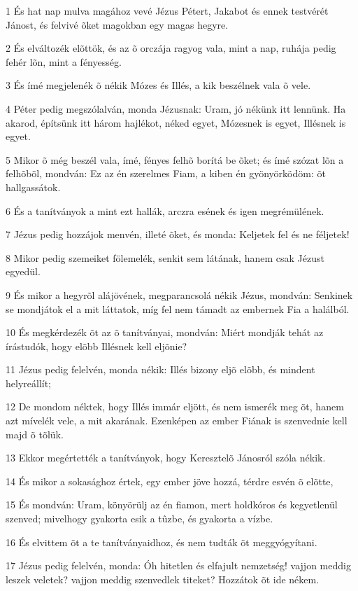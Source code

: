 \par 1 És hat nap mulva magához vevé Jézus Pétert, Jakabot és ennek testvérét Jánost, és felvivé õket magokban egy magas hegyre.
\par 2 És elváltozék elõttök, és az õ orczája ragyog vala, mint a nap, ruhája pedig fehér lõn, mint a fényesség.
\par 3 És ímé megjelenék õ nékik Mózes és Illés, a kik beszélnek vala õ vele.
\par 4 Péter pedig megszólalván, monda Jézusnak: Uram, jó nékünk itt lennünk. Ha akarod, építsünk itt három hajlékot, néked egyet, Mózesnek is egyet, Illésnek is egyet.
\par 5 Mikor õ még beszél vala, ímé, fényes felhõ borítá be õket; és ímé szózat lõn a felhõbõl, mondván: Ez az én szerelmes Fiam, a kiben én gyönyörködöm: õt hallgassátok.
\par 6 És a tanítványok a mint ezt hallák, arczra esének és igen megrémülének.
\par 7 Jézus pedig hozzájok menvén, illeté õket, és monda: Keljetek fel és ne féljetek!
\par 8 Mikor pedig szemeiket fölemelék, senkit sem látának, hanem csak Jézust egyedül.
\par 9 És mikor a hegyrõl alájövének, megparancsolá nékik Jézus, mondván: Senkinek se mondjátok el a mit láttatok, míg fel nem támadt az embernek Fia a halálból.
\par 10 És megkérdezék õt az õ tanítványai, mondván: Miért mondják tehát az írástudók, hogy elõbb Illésnek kell eljõnie?
\par 11 Jézus pedig felelvén, monda nékik: Illés bizony eljõ elõbb, és mindent helyreállít;
\par 12 De mondom néktek, hogy Illés immár eljött, és nem ismerék meg õt, hanem azt mívelék vele, a mit akarának. Ezenképen az ember Fiának is szenvednie kell majd õ tõlük.
\par 13 Ekkor megértették a tanítványok, hogy Keresztelõ Jánosról szóla nékik.
\par 14 És mikor a sokasághoz értek, egy ember jöve hozzá, térdre esvén õ elõtte,
\par 15 És mondván: Uram, könyörülj az én fiamon, mert holdkóros és kegyetlenül szenved; mivelhogy gyakorta esik a tûzbe, és gyakorta a vízbe.
\par 16 És elvittem õt a te tanítványaidhoz, és nem tudták õt meggyógyítani.
\par 17 Jézus pedig felelvén, monda: Óh hitetlen és elfajult nemzetség! vajjon meddig leszek veletek? vajjon meddig szenvedlek titeket? Hozzátok õt ide nékem.
